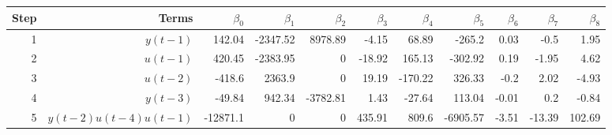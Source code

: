 \begin{tabular}{rrrrrrrrrrr}
Step & Terms & $\beta_{0}$ & $\beta_{1}$ & $\beta_{2}$ & $\beta_{3}$ & $\beta_{4}$ & $\beta_{5}$ & $\beta_{6}$ & $\beta_{7}$ & $\beta_{8}$ \\ 
\hline 
1 & $y(t-1)$ & 142.04 & -2347.52 & 8978.89 & -4.15 & 68.89 & -265.2 & 0.03 & -0.5 & 1.95 \\ 
2 & $u(t-1)$ & 420.45 & -2383.95 & 0 & -18.92 & 165.13 & -302.92 & 0.19 & -1.95 & 4.62 \\ 
3 & $u(t-2)$ & -418.6 & 2363.9 & 0 & 19.19 & -170.22 & 326.33 & -0.2 & 2.02 & -4.93 \\ 
4 & $y(t-3)$ & -49.84 & 942.34 & -3782.81 & 1.43 & -27.64 & 113.04 & -0.01 & 0.2 & -0.84 \\ 
5 & $y(t-2)u(t-4)u(t-1)$ & -12871.1 & 0 & 0 & 435.91 & 809.6 & -6905.57 & -3.51 & -13.39 & 102.69 \\ 
\hline 
\end{tabular}